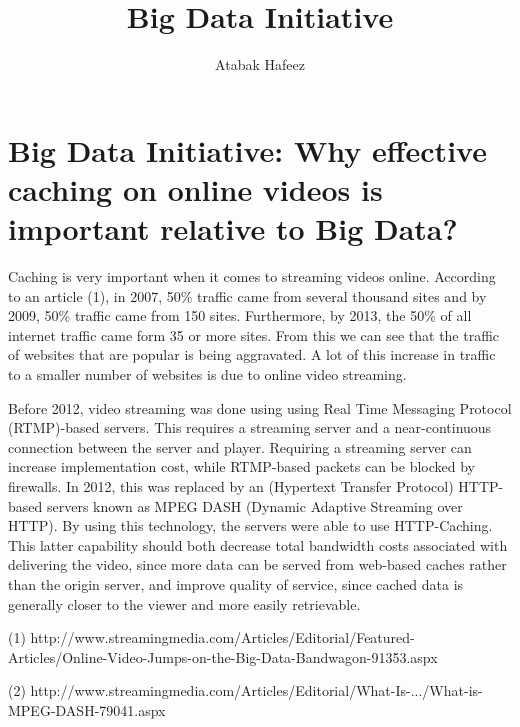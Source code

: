 \documentclass[11pt, oneside]{article}   	%
\title{Big Data Initiative}
\author{Atabak Hafeez}
\begin{document}
\maketitle
\section{Big Data Initiative: Why effective caching on online videos is important relative to Big Data?}

Caching is very important when it comes to streaming videos online. According to an article (1), in 2007, 50\% traffic came from several thousand sites and by 2009, 50\% traffic came from 150 sites. Furthermore, by 2013, the 50\% of all internet traffic came form 35 or more sites. From this we can see that the traffic of websites that are popular is being aggravated. A lot of this increase in traffic to a smaller number of websites is due to online video streaming.

Before 2012, video streaming was done using using Real Time Messaging Protocol (RTMP)-based servers. This requires a streaming server and a near-continuous connection between the server and player. Requiring a streaming server can increase implementation cost, while RTMP-based packets can be blocked by firewalls. In 2012, this was replaced by an (Hypertext Transfer Protocol) HTTP-based servers known as MPEG DASH (Dynamic Adaptive Streaming over HTTP).  By using this technology, the servers were able to use HTTP-Caching. This latter capability should both decrease total bandwidth costs associated with delivering the video, since more data can be served from web-based caches rather than the origin server, and improve quality of service, since cached data is generally closer to the viewer and more easily retrievable.




(1) http://www.streamingmedia.com/Articles/Editorial/Featured-Articles/Online-Video-Jumps-on-the-Big-Data-Bandwagon-91353.aspx

(2) http://www.streamingmedia.com/Articles/Editorial/What-Is-.../What-is-MPEG-DASH-79041.aspx

\end{document}
